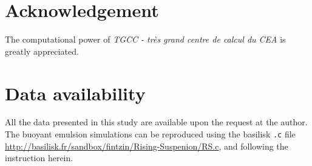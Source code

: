 


\section*{Acknowledgement}

The computational power of  \textit{TGCC - tr\`es grand centre de calcul du CEA} is greatly appreciated. 
\section*{Data availability}

All the data presented in this study are available upon the request at the author. 
The buoyant emulsion simulations can be reproduced using the basilisk \texttt{.c} file \url{http://basilisk.fr/sandbox/fintzin/Rising-Suspenion/RS.c}, and following the instruction herein. 
